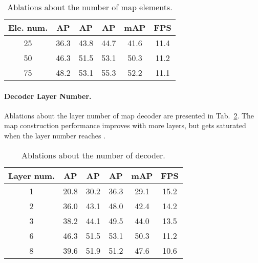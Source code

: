 \documentclass{article} \usepackage{iclr2023_conference,times}
\begin{document}
\begin{table}[ht]
\begin{center}
\begin{tabular}{c|ccc|cc}
\hline
\rowcolor{Gray}
Ele. num. & AP & AP & AP &mAP & FPS  \\
\toprule
25        &36.3&43.8&44.7& 41.6  & 11.4 \\
50  &\cellcolor{blue!10}46.3&\cellcolor{blue!10}51.5&\cellcolor{blue!10}53.1&\cellcolor{blue!10}50.3&\cellcolor{blue!10}11.2\\
75 &48.2&53.1&55.3  &52.2 & 11.1\\
\bottomrule
\end{tabular}
\end{center}
\vspace*{-0.45cm}
\caption{Ablations about the number of map elements.}
\label{tab:element-number}
\vspace*{-0.35cm}
\end{table}

\paragraph{Decoder Layer Number.}
Ablations about the layer number of map decoder are presented in Tab.~\ref{tab:layer-number}. The map construction performance improves with more layers, but gets saturated when the layer number reaches . 


\begin{table}[ht]
\begin{center}
\begin{tabular}{c|ccc|cc}
\hline
\rowcolor{Gray}
Layer num. & AP & AP & AP &mAP & FPS  \\
\toprule
1  &20.8 & 30.2 & 36.3& 29.1 & 15.2 \\
2  &36.0 & 43.1 & 48.0 & 42.4 & 14.2\\
3 &38.2 &44.1 & 49.5&  44.0 & 13.5\\
6 &\cellcolor{blue!10}46.3&\cellcolor{blue!10}51.5&\cellcolor{blue!10}53.1&\cellcolor{blue!10}50.3&\cellcolor{blue!10}11.2\\
8 &39.6 & 51.9 & 51.2& 47.6 & 10.6\\
\bottomrule
\end{tabular}
\end{center}
\vspace*{-0.45cm}
\caption{Ablations about the number of decoder. }
\label{tab:layer-number}
\vspace*{-0.35cm}
\end{table}
\end{document}
